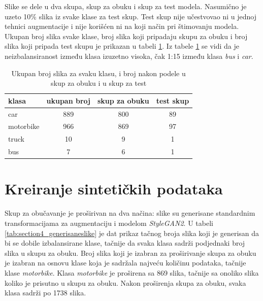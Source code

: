 \documentclass[12pt,oneside]{memoir}
\begin{document}
\clearpage
Slike se dele u dva skupa, skup za obuku i skup za test modela. Nasumično je uzeto 10\% slika iz svake klase za test skup. Test skup nije učestvovao ni u jednoj tehnici augmentacije i nije korišćen ni na koji način pri štimovanju modela. Ukupan broj slika svake klase, broj slika koji pripadaju skupu za obuku i broj slika koji pripada test skupu je prikazan u tabeli \ref{tab:section4_dostpunipodaci}. Iz tabele \ref{tab:section4_dostpunipodaci} se vidi da je neizbalansiranost između klasa izuzetno visoka, čak 1:15 između klasa \textit{bus} i \textit{car}.

\begin{table}[htb]
    \begin{center}
    \caption{Ukupan broj slika za svaku klasu, i broj nakon podele u skup za obuku i u skup za test }\label{tab:section4_dostpunipodaci}
    \begin{tabular}{l|c|c|c}
    klasa & ukupan broj & skup za obuku & test skup\\ 
    \hline
    car & 889 & 800 & 89 \\
    motorbike & 966 & 869 & 97 \\
    truck & 10 & 9 & 1 \\
    bus & 7 & 6 & 1 \\
    \end{tabular}
    \end{center}
\end{table}


\section{Kreiranje sintetičkih podataka}

Skup za obučavanje je proširivan na dva načina: slike su generisane standardnim transformacijama za augmentaciju i modelom \textit{StyleGAN2}. U tabeli \ref{tab:section4_generisaneslike} je dat prikaz tačnog broja slika koji je generisan da bi se dobile izbalansirane klase, tačnije da svaka klasa sadrži podjednaki broj slika u skupu za obuku. 
Broj slika koji je izabran za proširivanje skupa za obuku je izabran na osnovu klase koja je sadržala najveću količinu podataka, tačnije klase \textit{motorbike}. Klasa \textit{motorbike} je proširena sa 869 slika, tačnije sa onoliko slika koliko je prisutno u skupu za obuku. Nakon proširenja skupa za obuku, svaka klasa sadrži po 1738 slika.
\end{document}
